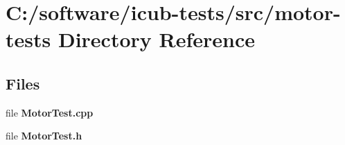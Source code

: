 \section{C\+:/software/icub-\/tests/src/motor-\/tests Directory Reference}
\label{dir_5eba7e4699fbf6bf477756242c12a311}
\subsection*{Files}
\begin{DoxyCompactItemize}
\item 
file {\bfseries Motor\+Test.\+cpp}
\item 
file {\bfseries Motor\+Test.\+h}
\end{DoxyCompactItemize}
